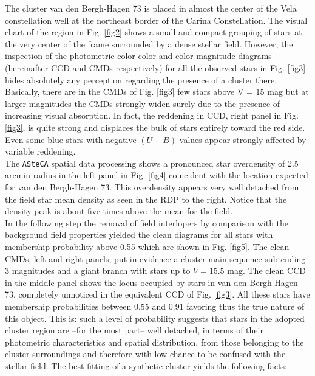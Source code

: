 \documentclass{aa}
\begin{document}
The cluster van den Bergh-Hagen 73 is placed in almost the center of the Vela
constellation well at the northeast border of the Carina Constellation. The
visual chart of the region in Fig. \ref{fig2} shows a small and compact grouping
of stars at the very center of the frame surrounded by a dense stellar field.
However, the inspection of the photometric color-color and color-magnitude
diagrams (hereinafter CCD and CMDs respectively) for all the observed stars in
Fig. \ref{fig3} hides absolutely any perception regarding the presence of a
cluster there. Basically, there are in the CMDs of Fig. \ref{fig3} few stars
above V = 15 mag but at larger magnitudes the CMDs strongly widen surely due to
the presence of increasing visual absorption. In fact, the reddening in CCD,
right panel in Fig. \ref{fig3}, is quite strong and displaces the bulk of stars
entirely toward the red side. Even some blue stars with negative $(U-B)$ values
appear strongly affected by variable reddening.\\

The \texttt{ASteCA} spatial data processing shows a pronounced star overdensity
of 2.5 arcmin radius in the left panel in Fig. \ref{fig4} coincident with the
location expected for van den Bergh-Hagen 73. This overdensity appears very well
detached from the field star mean density as seen in the RDP to the right.
Notice that the density peak is about five times above the mean for the field.\\

In the following step the removal of field interlopers by comparison with the
background field properties yielded the clean diagrams for all stars with
membership probability above 0.55 which are shown in Fig. \ref{fig5}. The clean
CMDs, left and right panels, put in evidence a cluster main sequence subtending
3 magnitudes and a giant branch with stars up to $V = 15.5$ mag. The clean CCD
in the middle panel shows the locus occupied by stars in van den Bergh-Hagen 73,
completely unnoticed in the equivalent CCD of Fig. \ref{fig3}. All these stars
have membership probabilities between 0.55 and 0.91 favoring thus the true
nature of this object. This is: such a level of probability suggests that stars
in the adopted cluster region are --for the most part-- well detached, in terms
of their photometric characteristics and spatial distribution, from those
belonging to the cluster surroundings and therefore with low chance to be
confused with the stellar field. The best fitting of a synthetic cluster
yields the following facts:
\end{document}
